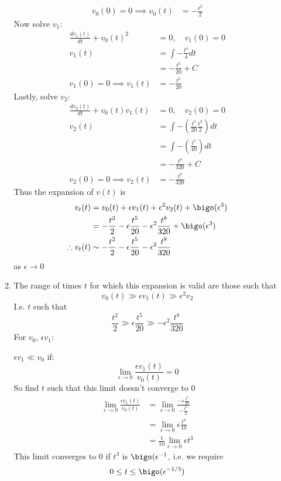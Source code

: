 \documentclass{/home/janmebows/Documents/LatexTemplates/myassignment}
\begin{document}
\begin{enumerate}
\begin{enumerate}
\begin{align*}
            v_0(0) = 0 \implies v_0(t) &= -\frac{t^2}{2}
        \end{align*}
        Now solve $v_1$:
        \begin{align*}
            \frac{dv_1(t)}{dt} + v_0(t)^2 &= 0, \quad v_1(0) = 0 \\
            v_1(t) &= \int -\frac{t^4}{4} dt\\
            &= -\frac{t^5}{20} + C\\
            v_1(0) = 0 \implies v_1(t) &= -\frac{t^5}{20}
        \end{align*}
        Lastly, solve $v_2$:
        \begin{align*}
            \frac{dv_2(t)}{dt} + v_0(t)v_1(t) &= 0, \quad v_2(0) = 0\\
            v_2(t) &= \int -\left(\frac{t^5}{20}\frac{t^2}{2}\right)dt\\
            &= \int -\left(\frac{t^7}{40}\right)dt\\
            &= - \frac{t^8}{320} +C\\
            v_2(0) = 0 \implies v_2(t) &= -\frac{t^8}{320}
        \end{align*}
        Thus the expansion of $v(t)$ is
        \begin{align*}
            v_t(t) &= v_0(t) + \epsilon v_1(t) + \epsilon^2 v_2(t) + \bigo(\epsilon^3)\\
            &= -\frac{t^2}{2} - \epsilon \frac{t^5}{20} - \epsilon^2 \frac{t^8}{320} + \bigo(\epsilon^3)\\
            \therefore v_t(t) &\sim -\frac{t^2}{2} - \epsilon \frac{t^5}{20} - \epsilon^2 \frac{t^8}{320}
        \end{align*}
        as $\epsilon \to 0$
        \item%
        The range of times $t$ for which this expansion is valid are those such that
        \[v_0(t) \gg \epsilon v_1(t) \gg \epsilon^2 v_2\]
        I.e. $t$ such that
        \[\frac{t^2}{2} \gg \epsilon \frac{t^5}{20} \gg -\epsilon^2 \frac{t^8}{320}\]
        For $v_0$, $\epsilon v_1$:
        
        $\epsilon v_1 \ll v_0$ if:
        \[\lim_{\epsilon \to 0} \frac{\epsilon v_1(t)}{v_0(t)} =0\]
        So find $t$ such that this limit doesn't converge to $0$
        \begin{align*}
            \lim_{\epsilon \to 0} \frac{\epsilon v_1(t)}{v_0(t)} &=\lim_{\epsilon \to 0} \frac{-\epsilon \frac{t^5}{20}}{-\frac{t^2}{2}}\\
            &= \lim_{\epsilon\to 0} \epsilon \frac{t^3}{10}\\
            &= \frac1{10 }\lim_{\epsilon\to 0 } \epsilon t^3
        \end{align*}
        This limit converges to $0$ if $t^3$ is $\bigo(\epsilon^{-1}$, i.e. we require
        \[0 \leq t \leq \bigo(\epsilon^{-1/3})\]
        

\end{enumerate}
\end{enumerate}
\end{document}
